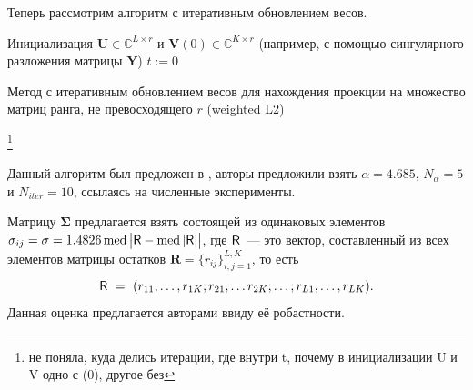 \documentclass[specialist,
               substylefile = spbu.rtx,
               subf,href,colorlinks=true, 12pt]{disser}
\DeclareMathOperator{\med}{med}
\begin{document}
Теперь рассмотрим алгоритм с итеративным обновлением весов.

\begin{algorithm}[H]
\SetAlgoLined
{}
 Инициализация $\mathbf{U} \in \mathbb{C}^{L\times r}$ и $\mathbf{V}(0) \in \mathbb{C}^{K\times r}$ (например, с помощью сингулярного разложения матрицы $\mathbf{Y}$)\;
 $t := 0$\;
 \caption{Метод с итеративным обновлением весов для нахождения проекции на множество матриц ранга, не превосходящего $r$ (weighted L2)}
\end{algorithm}
\footnote{не поняла, куда делись итерации, где внутри t, почему в инициализации U и V одно с (0), другое без}

Данный алгоритм был предложен в \cite{Chen}, авторы предложили взять $\alpha = 4.685$, $N_{\alpha} = 5$ и $N_{iter} = 10$, ссылаясь на численные эксперименты.

Матрицу $\mathbf{\Sigma}$ предлагается взять состоящей из одинаковых элементов $\sigma_{ij} = \sigma = 1.4826 \med {\big|\tR-\med {|\tR|}\big|}$, где $\textsf{R}$~--- это вектор, составленный из всех элементов матрицы остатков $\mathbf{R} = \{r_{ij}\}_{i,j=1}^{L,K}$, то есть
\begin{equation*}
	\textsf{R}~=~(r_{11},\ldots,r_{1K}; r_{21},\ldots r_{2K};\ldots;r_{L1},\ldots,r_{LK}).
\end{equation*}
Данная оценка предлагается авторами ввиду её робастности.
\end{document}
